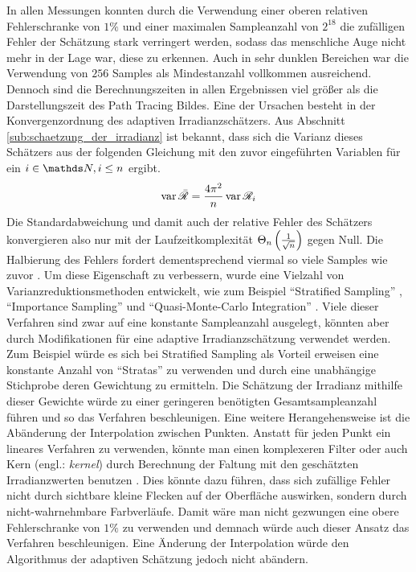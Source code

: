 		In allen Messungen konnten durch die Verwendung einer oberen relativen Fehlerschranke von $1\unit{\%}$ und einer maximalen Sampleanzahl von $2^{18}$ die zufälligen Fehler der Schätzung stark verringert werden, sodass das menschliche Auge nicht mehr in der Lage war, diese zu erkennen.
		Auch in sehr dunklen Bereichen war die Verwendung von $256$ Samples als Mindestanzahl vollkommen ausreichend.
		Dennoch sind die Berechnungszeiten in allen Ergebnissen viel größer als die Darstellungszeit des Path Tracing Bildes.
		Eine der Ursachen besteht in der Konvergenzordnung des adaptiven Irradianzschätzers.
		Aus Abschnitt \ref{sub:schaetzung_der_irradianz} ist bekannt, dass sich die Varianz dieses Schätzers aus der folgenden Gleichung mit den zuvor eingeführten Variablen für ein $i\in\SN,i\leq n$ ergibt.
		\[
			\operatorname{var} \bar{\mathscr{R}} = \frac{4\pi^2}{n}\operatorname{var} \mathscr{R}_i
		\]
		Die Standardabweichung und damit auch der relative Fehler des Schätzers konvergieren also nur mit der Laufzeitkomplexität $\Theta_n\left( \frac{1}{\sqrt{n}} \right)$ gegen Null.
		Die Halbierung des Fehlers fordert dementsprechend viermal so viele Samples wie zuvor \cite[S.~39~f]{veach-thesis}.
		Um diese Eigenschaft zu verbessern, wurde eine Vielzahl von Varianzreduktionsmethoden entwickelt, wie zum Beispiel \enquote{Stratified Sampling} \cite[S.~432~ff]{pbrt3}, \enquote{Importance Sampling} \cite[S.~794~ff]{pbrt3} und \enquote{Quasi-Monte-Carlo Integration} \cite{quasi-monte-carlo}.
		Viele dieser Verfahren sind zwar auf eine konstante Sampleanzahl ausgelegt, könnten aber durch Modifikationen für eine adaptive Irradianzschätzung verwendet werden.
		Zum Beispiel würde es sich bei Stratified Sampling als Vorteil erweisen eine konstante Anzahl von \enquote{Stratas} zu verwenden und durch eine unabhängige Stichprobe deren Gewichtung zu ermitteln.
		Die Schätzung der Irradianz mithilfe dieser Gewichte würde zu einer geringeren benötigten Gesamtsampleanzahl führen und so das Verfahren beschleunigen.
		Eine weitere Herangehensweise ist die Abänderung der Interpolation zwischen Punkten.
		Anstatt für jeden Punkt ein lineares Verfahren zu verwenden, könnte man einen komplexeren Filter oder auch Kern (engl.: \textit{kernel}) durch Berechnung der Faltung mit den geschätzten Irradianzwerten benutzen \cite[S.~402~ff]{pbrt3}.
		Dies könnte dazu führen, dass sich zufällige Fehler nicht durch sichtbare kleine Flecken auf der Oberfläche auswirken, sondern durch nicht-wahrnehmbare Farbverläufe.
		Damit wäre man nicht gezwungen eine obere Fehlerschranke von $1\unit{\%}$ zu verwenden und demnach würde auch dieser Ansatz das Verfahren beschleunigen.
		Eine Änderung der Interpolation würde den Algorithmus der adaptiven Schätzung jedoch nicht abändern.


